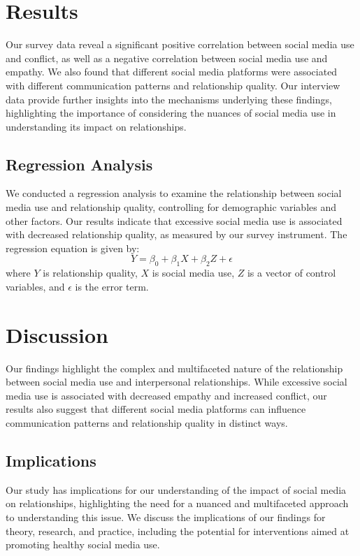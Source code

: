 \documentclass[12pt,a4paper]{article}
\begin{document}
\section{Results}
Our survey data reveal a significant positive correlation between social media use and conflict, as well as a negative correlation between social media use and empathy. We also found that different social media platforms were associated with different communication patterns and relationship quality. Our interview data provide further insights into the mechanisms underlying these findings, highlighting the importance of considering the nuances of social media use in understanding its impact on relationships.

\subsection{Regression Analysis}
We conducted a regression analysis to examine the relationship between social media use and relationship quality, controlling for demographic variables and other factors. Our results indicate that excessive social media use is associated with decreased relationship quality, as measured by our survey instrument. The regression equation is given by:
\[ Y = \beta_0 + \beta_1X + \beta_2Z + \epsilon \]
where $Y$ is relationship quality, $X$ is social media use, $Z$ is a vector of control variables, and $\epsilon$ is the error term.

\section{Discussion}
Our findings highlight the complex and multifaceted nature of the relationship between social media use and interpersonal relationships. While excessive social media use is associated with decreased empathy and increased conflict, our results also suggest that different social media platforms can influence communication patterns and relationship quality in distinct ways.

\subsection{Implications}
Our study has implications for our understanding of the impact of social media on relationships, highlighting the need for a nuanced and multifaceted approach to understanding this issue. We discuss the implications of our findings for theory, research, and practice, including the potential for interventions aimed at promoting healthy social media use.
\end{document}

